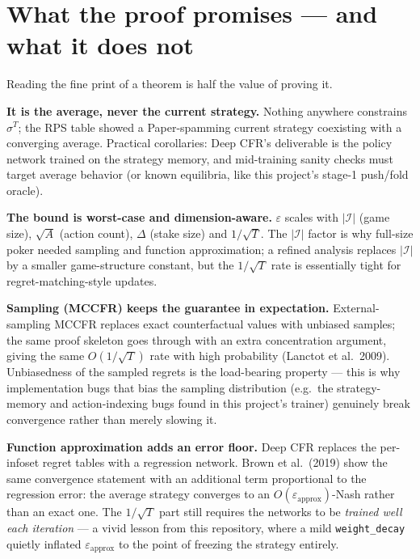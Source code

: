 \documentclass[11pt,a4paper]{article}
\begin{document}
\section{What the proof promises --- and what it does not}

Reading the fine print of a theorem is half the value of proving it.

\textbf{It is the average, never the current strategy.} Nothing anywhere
constrains $\sigma^T$; the RPS table showed a Paper-spamming current strategy
coexisting with a converging average. Practical corollaries: Deep CFR's
deliverable is the policy network trained on the strategy memory, and
mid-training sanity checks must target average behavior (or known
equilibria, like this project's stage-1 push/fold oracle).

\textbf{The bound is worst-case and dimension-aware.} $\varepsilon$ scales
with $|\mathcal{I}|$ (game size), $\sqrt{A}$ (action count), $\Delta$ (stake
size) and $1/\sqrt{T}$. The $|\mathcal{I}|$ factor is why full-size poker
needed sampling and function approximation; a refined analysis replaces
$|\mathcal{I}|$ by a smaller game-structure constant, but the $1/\sqrt{T}$
rate is essentially tight for regret-matching-style updates.

\textbf{Sampling (MCCFR) keeps the guarantee in expectation.}
External-sampling MCCFR replaces exact counterfactual values with unbiased
samples; the same proof skeleton goes through with an extra concentration
argument, giving the same $O(1/\sqrt{T})$ rate with high probability
(Lanctot et al.\ 2009). Unbiasedness of the sampled regrets is the
load-bearing property --- this is why implementation bugs that bias the
sampling distribution (e.g.\ the strategy-memory and action-indexing bugs
found in this project's trainer) genuinely break convergence rather than
merely slowing it.

\textbf{Function approximation adds an error floor.} Deep CFR replaces the
per-infoset regret tables with a regression network. Brown et al.\ (2019)
show the same convergence statement with an additional term proportional to
the regression error: the average strategy converges to an
$O(\varepsilon_{\mathrm{approx}})$-Nash rather than an exact one. The
$1/\sqrt{T}$ part still requires the networks to be \emph{trained well each
iteration} --- a vivid lesson from this repository, where a mild
\texttt{weight\_decay} quietly inflated $\varepsilon_{\mathrm{approx}}$ to
the point of freezing the strategy entirely.
\end{document}
